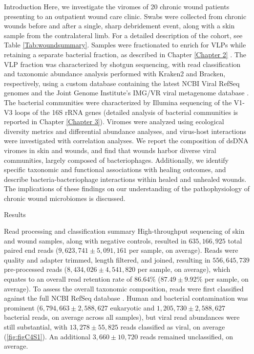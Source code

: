 \documentclass[oneside,12pt,final]{sty/ucthesis-CA2012}
\begin{document}
\begin{mainmatter}
\begin{section}{Introduction}
Here, we investigate the viromes of 20 chronic wound patients presenting to an outpatient wound care clinic. Swabs were collected from chronic wounds before and after a single, sharp debridement event, along with a skin sample from the contralateral limb. For a detailed description of the cohort, see Table \ref{Tab:woundsummary}. Samples were fractionated to enrich for VLPs while retaining a separate bacterial fraction, as described in Chapter \ref{Chapter 2} \cite{RN41}. The VLP fraction was characterized by shotgun sequencing, with read classification and taxonomic abundance analysis performed with Kraken2 and Bracken, respectively, using a custom database containing the latest NCBI Viral RefSeq genomes and the Joint Genome Institute's IMG/VR viral metagenome database \cite{RN172, RN173, RN175, RN78}. The bacterial communities were characterized by Illumina sequencing of the V1-V3 loops of the 16S rRNA genes (detailed analysis of bacterial communities is reported in Chapter \ref{Chapter 3}). Viromes were analyzed using ecological diversity metrics and differential abundance analyses, and virus-host interactions were investigated with correlation analyses. We report the composition of dsDNA viromes in skin and wounds, and find that wounds harbor diverse viral communities, largely composed of bacteriophages. Additionally, we identify specific taxonomic and functional associations with healing outcomes, and describe bacteria-bacteriophage interactions within healed and unhealed wounds. The implications of these findings on our understanding of the pathophysiology of chronic wound microbiomes is discussed.
\end{section}

\begin{section}{Results}
\begin{subsection}{Read processing and classification summary}
High-throughput sequencing of skin and wound samples, along with negative controls, resulted in $635,166,925$ total paired end reads ($9,623,741 \pm 5,091,161$ per sample, on average). Reads were quality and adapter trimmed, length filtered, and joined, resulting in $556,645,739$ pre-processed reads ($8,434,026 \pm 4,541,820$ per sample, on average), which equates to an overall read retention rate of $86.64\%$ ($87.49 \pm 9.92\%$ per sample, on average). To assess the overall taxonomic composition, reads were first classified against the full NCBI RefSeq database \cite{RN174}. Human and bacterial contamination was prominent ($6,794,663 \pm 2,588,627$ eukaryotic and $1,205,730 \pm 2,588,627$ bacterial reads, on average across all samples), but viral read abundances were still substantial, with $13,278 \pm 55,825$ reads classified as viral, on average (\ref{fig:figC4S1}). An additional $3,660 \pm 10,720$ reads remained unclassified, on average.


\end{subsection}
\end{section}
\end{mainmatter}
\end{document}
